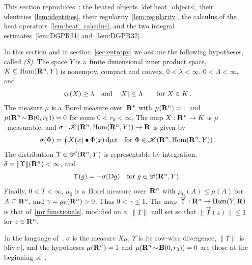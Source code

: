 \documentclass[a4paper,twoside,leqno]{article}
\newcommand{\sv}[1]{\varsigma_{#1}}        %
\newcommand{\dUps}{\overrightarrow{\Upsilon}} %
\begin{document}
\begin{miniremark}
    \label{mr:standing}
    This section reproduces~\cite[section~3]{DePhilippisGennaioliPigatiRindler2026}: the heated
    objects~\ref{def:heat_objects}, their identities~\ref{lem:identities}, their
    regularity~\ref{lem:regularity}, the calculus of the heat operators~\ref{lem:heat_calculus},
    and the two integral estimates~\ref{lem:DGPR31} and~\ref{lem:DGPR32}.

    In this section and in section~\ref{sec:entropy} we assume the following hypotheses, called
    \emph{(S)}. The space $Y$ is a~finite dimensional inner product space, $K \subseteq
    \operatorname{Hom}(\mathbf{R}^{n},Y)$ is nonempty, compact and convex, $0 < \lambda < \infty$, $0 < \Lambda <
    \infty$, and
    \begin{displaymath}
        \sv{\vdim}(X) \ge \lambda \quad \text{and} \quad |X| \le \Lambda
        \qquad \text{for $X \in K$} \,.
    \end{displaymath}
    The measure $\mu$ is a~Borel measure over~$\mathbf{R}^{n}$ with $\mu(\mathbf{R}^{n}) = 1$ and
    $\mu(\mathbf{R}^{n} \!\sim\! \mathbf{B}(0,r_0)) = 0$ for some $0 < r_0 < \infty$. The map $X :
    \mathbf{R}^{n} \to K$ is $\mu$~measurable, and $\sigma : \mathscr{K}(\mathbf{R}^{n},\operatorname{Hom}(\mathbf{R}^{n},Y))
    \to \mathbf{R}$ is given by
    \begin{displaymath}
        \sigma(\Phi) = {\textstyle\int_{}^{}} X(x) \bullet \Phi(x) \,\mathrm{d} \mu x
        \quad \text{for $\Phi \in \mathscr{K}(\mathbf{R}^{n},\operatorname{Hom}(\mathbf{R}^{n},Y))$} \,.
    \end{displaymath}
    The distribution $\Upsilon \in \mathscr{D}'(\mathbf{R}^{n},Y)$ is representable by integration,
    $\delta = \|\Upsilon\|(\mathbf{R}^{n}) < \infty$, and
    \begin{displaymath}
        \Upsilon(g) = - \sigma(\mathrm{D} g) \quad \text{for $g \in \mathscr{D}(\mathbf{R}^{n},Y)$} \,.
    \end{displaymath}
    Finally, $0 < T < \infty$, $\mu_0$ is a~Borel measure over~$\mathbf{R}^{n}$ with $\mu_0(A) \le
    \mu(A)$ for $A \subseteq \mathbf{R}^{n}$, and $\gamma = \mu_0(\mathbf{R}^{n}) > 0$. Thus $0 < \gamma
    \le 1$. The map $\dUps : \R^{\adim} \to \Hom(Y,\R)$ is that of~\ref{mr:functionals},
    modified on a~$\|\Upsilon\|$ null set so that $\|\dUps(z)\| \le 1$ for $z \in \mathbf{R}^{n}$.

    In the language of~\cite{DePhilippisGennaioliPigatiRindler2026}, $\sigma$ is the measure $X
    \mu$, $\Upsilon$ is its row-wise divergence, $\|\Upsilon\|$ is $|\mathrm{div}\, \sigma|$, and
    the hypotheses $\mu(\mathbf{R}^{n}) = 1$ and $\mu(\mathbf{R}^{n} \!\sim\! \mathbf{B}(0,r_0)) = 0$ are
    those at the beginning of~\cite[section~3]{DePhilippisGennaioliPigatiRindler2026}.
\end{miniremark}
\end{document}
